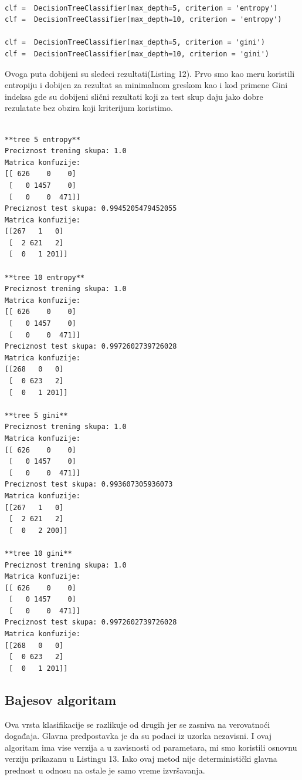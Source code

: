 \documentclass[14pt]{extarticle}
\begin{document}
\begin{lstlisting}[caption={Vizuelizacija},frame=single, label=simple]

clf =  DecisionTreeClassifier(max_depth=5, criterion = 'entropy')
clf =  DecisionTreeClassifier(max_depth=10, criterion = 'entropy')

clf =  DecisionTreeClassifier(max_depth=5, criterion = 'gini')
clf =  DecisionTreeClassifier(max_depth=10, criterion = 'gini')

\end{lstlisting}
Ovoga puta dobijeni su sledeci rezultati(Listing 12). Prvo smo kao meru koristili entropiju i dobijen za rezultat sa minimalnom greskom kao i kod primene Gini indeksa gde su dobijeni slični rezultati koji za test skup daju jako dobre rezulatate bez obzira koji kriterijum koristimo. 
\begin{lstlisting}[caption={Vizuelizacija},frame=single, label=simple]

**tree 5 entropy**
Preciznost trening skupa: 1.0
Matrica konfuzije:
[[ 626    0    0]
 [   0 1457    0]
 [   0    0  471]]
Preciznost test skupa: 0.9945205479452055
Matrica konfuzije:
[[267   1   0]
 [  2 621   2]
 [  0   1 201]]
 
**tree 10 entropy**
Preciznost trening skupa: 1.0
Matrica konfuzije:
[[ 626    0    0]
 [   0 1457    0]
 [   0    0  471]]
Preciznost test skupa: 0.9972602739726028
Matrica konfuzije:
[[268   0   0]
 [  0 623   2]
 [  0   1 201]]
 
**tree 5 gini**
Preciznost trening skupa: 1.0
Matrica konfuzije:
[[ 626    0    0]
 [   0 1457    0]
 [   0    0  471]]
Preciznost test skupa: 0.993607305936073
Matrica konfuzije:
[[267   1   0]
 [  2 621   2]
 [  0   2 200]]

**tree 10 gini**
Preciznost trening skupa: 1.0
Matrica konfuzije:
[[ 626    0    0]
 [   0 1457    0]
 [   0    0  471]]
Preciznost test skupa: 0.9972602739726028
Matrica konfuzije:
[[268   0   0]
 [  0 623   2]
 [  0   1 201]]

\end{lstlisting}
\subsection{Bajesov algoritam}
\label{subsec:podnaslovM}
Ova vrsta klasifikacije se razlikuje od drugih jer se zasniva na verovatnoći događaja. Glavna predpostavka je da su podaci iz uzorka nezavisni. I ovaj algoritam ima vise verzija a u zavisnosti od parametara, mi smo koristili osnovnu verziju prikazanu u Listingu 13. Iako ovaj metod nije deterministički glavna prednost u odnosu na ostale je samo vreme izvršavanja.
\end{document}
